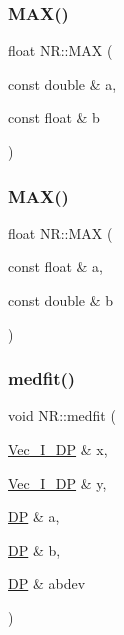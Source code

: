 \mbox{\label{namespaceNR_a1ccd7f766f5de91f30115cf7298019fa}} 
\subsubsection{\texorpdfstring{MAX()}{MAX()}\hspace{0.1cm}{\footnotesize\ttfamily [2/3]}}
{\footnotesize\ttfamily float N\+R\+::\+M\+AX (\begin{DoxyParamCaption}\item[{const double \&}]{a,  }\item[{const float \&}]{b }\end{DoxyParamCaption})\hspace{0.3cm}{\ttfamily [inline]}}

\mbox{\label{namespaceNR_a77558a6eb41778af357e2b2fbc811eeb}} 
\subsubsection{\texorpdfstring{MAX()}{MAX()}\hspace{0.1cm}{\footnotesize\ttfamily [3/3]}}
{\footnotesize\ttfamily float N\+R\+::\+M\+AX (\begin{DoxyParamCaption}\item[{const float \&}]{a,  }\item[{const double \&}]{b }\end{DoxyParamCaption})\hspace{0.3cm}{\ttfamily [inline]}}

\mbox{\label{namespaceNR_aab044381afb3d475fea1f56f27b43677}} 
\subsubsection{\texorpdfstring{medfit()}{medfit()}}
{\footnotesize\ttfamily void N\+R\+::medfit (\begin{DoxyParamCaption}\item[{\mbox{\hyperlink{namespaceNR_a9f943da53862537c552e2a770cb170ae}{Vec\+\_\+\+I\+\_\+\+DP}} \&}]{x,  }\item[{\mbox{\hyperlink{namespaceNR_a9f943da53862537c552e2a770cb170ae}{Vec\+\_\+\+I\+\_\+\+DP}} \&}]{y,  }\item[{\mbox{\hyperlink{namespaceNR_af6ff762dd605ff477b8e52387253a02a}{DP}} \&}]{a,  }\item[{\mbox{\hyperlink{namespaceNR_af6ff762dd605ff477b8e52387253a02a}{DP}} \&}]{b,  }\item[{\mbox{\hyperlink{namespaceNR_af6ff762dd605ff477b8e52387253a02a}{DP}} \&}]{abdev }\end{DoxyParamCaption})}

